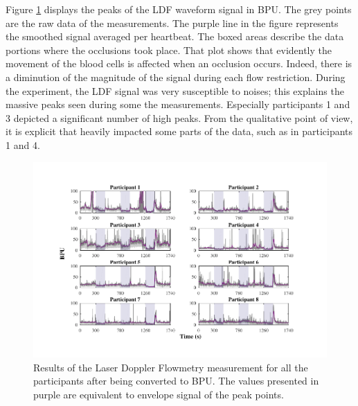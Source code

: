 Figure \ref{fig:LDF flow} displays the peaks of the LDF waveform signal in BPU. The grey points are the raw data of the measurements. The purple line in the figure represents the smoothed signal averaged per heartbeat. The boxed areas describe the data portions where the occlusions took place. That plot shows that evidently the movement of the blood cells is affected when an occlusion occurs. Indeed, there is a diminution of the magnitude of the signal during each flow restriction. During the experiment, the LDF signal was very susceptible to noises; this explains the massive peaks seen during some the measurements. Especially participants 1 and 3 depicted a significant number of high peaks. From the qualitative point of view, it is explicit that heavily impacted some parts of the data, such as in participants 1 and 4.

\begin{figure}[!htb]
	\centering
	\includegraphics[width=\textwidth,keepaspectratio,trim={1cm 0cm 1.5cm 0cm},clip]{figure_cmp_3}    
	\caption[Results of the LDF in BPU]{Results of the Laser Doppler Flowmetry measurement for all the participants after being converted to BPU. The values presented in purple are equivalent to envelope signal of the peak points.}
	\label{fig:LDF flow}
\end{figure}

